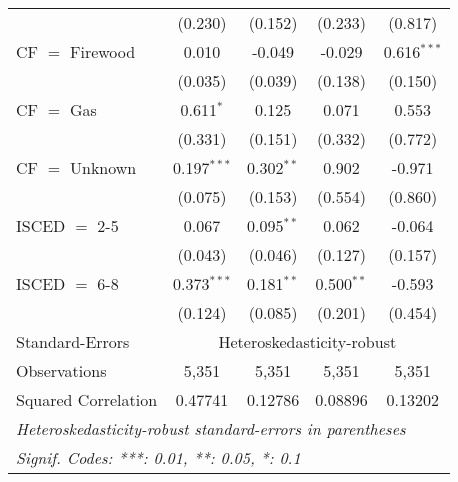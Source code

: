 \begin{table}[htbp!]
\begin{adjustbox}{width = 1\textwidth, max height = 0.95\textheight, center}
\begin{threeparttable}[b]
\begin{tabular}{lcccc}
                                 & (0.230)            & (0.152)            & (0.233)        & (0.817)\\   
            CF $=$ Firewood      & 0.010              & -0.049             & -0.029         & 0.616$^{***}$\\   
                                 & (0.035)            & (0.039)            & (0.138)        & (0.150)\\   
            CF $=$ Gas           & 0.611$^{*}$        & 0.125              & 0.071          & 0.553\\   
                                 & (0.331)            & (0.151)            & (0.332)        & (0.772)\\   
            CF $=$ Unknown       & 0.197$^{***}$      & 0.302$^{**}$       & 0.902          & -0.971\\   
                                 & (0.075)            & (0.153)            & (0.554)        & (0.860)\\   
            ISCED $=$ 2-5        & 0.067              & 0.095$^{**}$       & 0.062          & -0.064\\   
                                 & (0.043)            & (0.046)            & (0.127)        & (0.157)\\   
            ISCED $=$ 6-8        & 0.373$^{***}$      & 0.181$^{**}$       & 0.500$^{**}$   & -0.593\\   
                                 & (0.124)            & (0.085)            & (0.201)        & (0.454)\\   
            \midrule 
            Standard-Errors & \multicolumn{4}{c}{Heteroskedasticity-robust} \\ 
            Observations         & 5,351              & 5,351              & 5,351          & 5,351\\  
            Squared Correlation  & 0.47741            & 0.12786            & 0.08896        & 0.13202\\  
            \midrule \midrule
            \multicolumn{5}{l}{\emph{Heteroskedasticity-robust standard-errors in parentheses}}\\
            \multicolumn{5}{l}{\emph{Signif. Codes: ***: 0.01, **: 0.05, *: 0.1}}\\
         \end{tabular}
         

\end{threeparttable}
\end{adjustbox}
\end{table}
